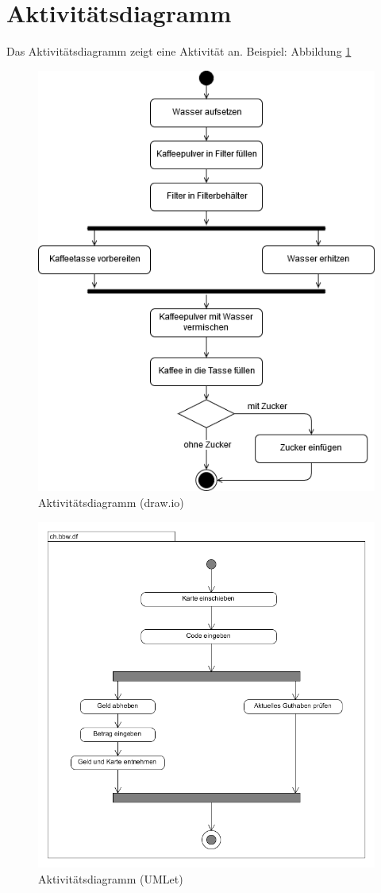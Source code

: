 \documentclass[a4paper, titlepage]{scrartcl}
\begin{document}
    \section{Aktivitätsdiagramm}
    Das Aktivitätsdiagramm zeigt eine Aktivität an. 
    Beispiel: Abbildung \ref{AktivitaetsdiagrammDrawIO}
    \begin{figure}
        \includegraphics[width=\textwidth]{Aktivitaetsdiagramm1a.png}
        \caption{Aktivitätsdiagramm (draw.io)}
        \label{AktivitaetsdiagrammDrawIO}
    \end{figure}
    \begin{figure}
        \includegraphics[width=\textwidth]{Aktivitaetsdiagramm1b.png}
        \caption{Aktivitätsdiagramm (UMLet)}
        \label{AktivitaetsdiagrammUmlet}
    \end{figure}
    
\end{document}
